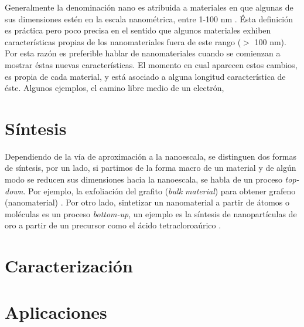 
Generalmente la denominación nano es atribuida a materiales en que algunas de sus dimensiones estén en la escala nanométrica, entre 1-100 nm \citep{Gressler2013}. Ésta definición es práctica pero poco precisa en el sentido que algunos materiales exhiben características propias de los nanomateriales fuera de este rango ($>$ 100 nm). Por esta razón es preferible hablar de nanomateriales cuando se comienzan a mostrar éstas nuevas características. El momento en cual aparecen estos cambios, es propia de cada material, y está asociado a alguna longitud característica de éste. Algunos ejemplos, el camino libre medio de un electrón,

\section{Síntesis}
Dependiendo de la vía de aproximación a la nanoescala, se distinguen dos formas de síntesis, por un lado, si partimos de la forma macro de un material y de algún modo se reducen sus dimensiones hacia la nanoescala, se habla de un proceso \textit{top-down}. Por ejemplo, la exfoliación del grafito (\textit{bulk material}) para obtener grafeno (nanomaterial) \citep{Novoselov2004}.  Por otro lado, sintetizar un nanomaterial a partir de átomos o moléculas es un proceso \textit{bottom-up}, un ejemplo es la síntesis de nanopartículas de oro a partir de un precursor como el ácido tetracloroaúrico \citep{Daniel2004}.

\section{Caracterización}


\section{Aplicaciones}

